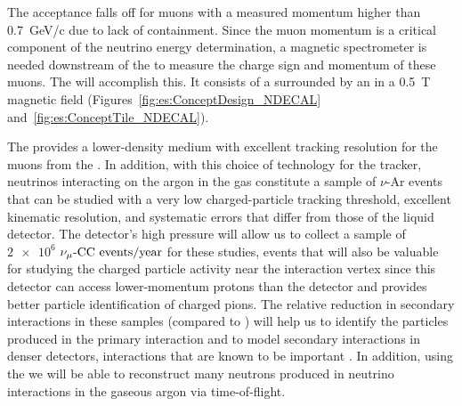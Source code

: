 The  acceptance falls off for muons with a measured momentum higher than \SI{0.7}{GeV/c} due to lack of containment.  Since the muon momentum is a critical component of the neutrino energy determination, a magnetic spectrometer is needed downstream of the  to measure the charge sign and momentum of these muons.  
The  will accomplish this. It consists of a  surrounded by an  in a \SI{0.5}{T} magnetic field (Figures~\ref{fig:es:ConceptDesign_NDECAL} and~\ref{fig:es:ConceptTile_NDECAL}). 

The  provides a lower-density medium with excellent tracking resolution for the muons from the .  In addition, with this choice of technology for the tracker, neutrinos interacting on the argon in the gas  constitute a sample of $\nu$-Ar events that can be studied with a very low charged-particle tracking threshold, excellent kinematic resolution, and systematic errors that differ from those of the liquid detector. %
The detector's high pressure will allow us to collect a sample of $\num{2e6}$ ${\nu_\mu \text{-CC events/year}}$ for these studies, events that will also  %
be valuable for studying the charged particle activity near the interaction vertex %
since this detector can access lower-momentum protons than the  detector and %
provides better particle identification of charged pions.  The relative reduction in secondary interactions in these samples (compared to ) will help us to identify the particles produced in the primary interaction and to model secondary interactions in denser detectors, interactions that are known to be important \cite{Friedland:2018vry}.
In addition, using the  we will be able to reconstruct 
many neutrons produced in neutrino interactions in the gaseous argon %
via time-of-flight.    
  

